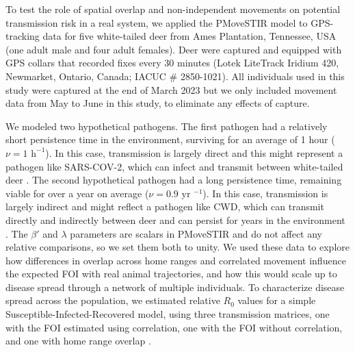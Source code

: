 \documentclass[letterpaper]{article}
\begin{document}
To test the role of spatial overlap and non-independent movements on potential transmission risk in a real system, we applied the PMoveSTIR model to GPS-tracking data for five white-tailed deer from Ames Plantation, Tennessee, USA (one adult male and four adult females). 
Deer were captured and equipped with GPS collars that recorded fixes every 30 minutes (Lotek LiteTrack Iridium 420, Newmarket, Ontario, Canada; IACUC \# 2850-1021).  All individuals used in this study were captured at the end of March 2023 but we only included movement data from May to June in this study, to eliminate any effects of capture. 

We modeled two hypothetical pathogens. The first pathogen had a relatively short persistence time in the environment, surviving for an average of 1 hour  ($\nu=1\text{ h}^{-1 }$). In this case, transmission is largely direct and this might represent a pathogen like SARS-COV-2, which can infect and transmit between white-tailed deer \citep{Hale2022}. The second hypothetical pathogen had a long persistence time, remaining viable for over a year on average ($\nu=0.9 \text{ yr }^{-1}$). In this case, transmission is largely indirect and might reflect a pathogen like CWD, which can transmit directly and indirectly between deer and can persist for years in the environment \citep{Saunders2012a}. The $\beta'$ and $\lambda$ parameters are scalars in PMoveSTIR and do not affect any relative comparisons, so we set them both to unity. %
We used these data to explore how differences in overlap across home ranges and correlated movement influence the expected FOI with real animal trajectories, and how this would scale up to disease spread through a network of multiple individuals. To characterize disease spread across the population, we estimated relative $R_0$ values for a simple Susceptible-Infected-Recovered model, using three transmission matrices, one with the FOI estimated using correlation, one with the FOI without correlation, and one with home range overlap \citep{Wilber2022}.  %
\end{document}
